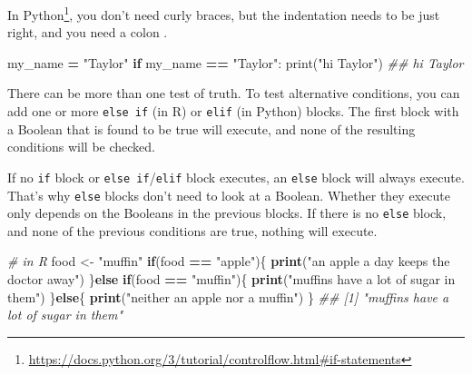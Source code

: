 \documentclass[12pt,krantz2]{krantz}
\makeatletter
\newenvironment{Shaded}{\begin{snugshade}}{\end{snugshade}}
\newcommand{\BuiltInTok}[1]{#1}
\newcommand{\CommentTok}[1]{\textcolor[rgb]{0.37,0.37,0.37}{\textit{#1}}}
\newcommand{\ControlFlowTok}[1]{\textcolor[rgb]{0.27,0.27,0.27}{\textbf{#1}}}
\newcommand{\KeywordTok}[1]{\textcolor[rgb]{0.27,0.27,0.27}{\textbf{#1}}}
\newcommand{\NormalTok}[1]{#1}
\newcommand{\OperatorTok}[1]{\textcolor[rgb]{0.43,0.43,0.43}{\textbf{#1}}}
\newcommand{\StringTok}[1]{\textcolor[rgb]{0.5,0.5,0.5}{#1}}
\renewcommand{\href}[2]{#2\footnote{\url{#1}}}
\newenvironment{kframe}{%
\medskip{}
\setlength{\fboxsep}{.8em}
 \def\at@end@of@kframe{}%
 \ifinner\ifhmode%
  \def\at@end@of@kframe{\end{minipage}}%
  \begin{minipage}{\columnwidth}%
 \fi\fi%
 \def\FrameCommand##1{\hskip\@totalleftmargin \hskip-\fboxsep
 \colorbox{shadecolor}{##1}\hskip-\fboxsep
     \hskip-\linewidth \hskip-\@totalleftmargin \hskip\columnwidth}%
 \MakeFramed {\advance\hsize-\width
   \@totalleftmargin\z@ \linewidth\hsize
   \@setminipage}}%
 {\par\unskip\endMakeFramed%
 \at@end@of@kframe}
\renewenvironment{Shaded}{\begin{kframe}}{\end{kframe}}
\makeatother
\begin{document}
\href{https://docs.python.org/3/tutorial/controlflow.html\#if-statements}{In Python}, you don't need curly braces, but the indentation needs to be just right, and you need a colon \citep{Lutz13}.

\begin{Shaded}
\begin{Highlighting}[]
\NormalTok{my_name }\OperatorTok{=} \StringTok{"Taylor"}
\ControlFlowTok{if}\NormalTok{ my_name }\OperatorTok{==} \StringTok{"Taylor"}\NormalTok{:}
    \BuiltInTok{print}\NormalTok{(}\StringTok{"hi Taylor"}\NormalTok{)}
\CommentTok{## hi Taylor}
\end{Highlighting}
\end{Shaded}

There can be more than one test of truth. To test alternative conditions, you can add one or more \texttt{else\ if} (in R) or \texttt{elif} (in Python) blocks. The first block with a Boolean that is found to be true will execute, and none of the resulting conditions will be checked.

If no \texttt{if} block or \texttt{else\ if}/\texttt{elif} block executes, an \texttt{else} block will always execute. That's why \texttt{else} blocks don't need to look at a Boolean. Whether they execute only depends on the Booleans in the previous blocks. If there is no \texttt{else} block, and none of the previous conditions are true, nothing will execute.

\begin{Shaded}
\begin{Highlighting}[]
\CommentTok{# in R}
\NormalTok{food <-}\StringTok{ "muffin"}
\ControlFlowTok{if}\NormalTok{(food }\OperatorTok{==}\StringTok{ "apple"}\NormalTok{)\{}
    \KeywordTok{print}\NormalTok{(}\StringTok{"an apple a day keeps the doctor away"}\NormalTok{)}
\NormalTok{\}}\ControlFlowTok{else} \ControlFlowTok{if}\NormalTok{(food }\OperatorTok{==}\StringTok{ "muffin"}\NormalTok{)\{}
  \KeywordTok{print}\NormalTok{(}\StringTok{"muffins have a lot of sugar in them"}\NormalTok{)}
\NormalTok{\}}\ControlFlowTok{else}\NormalTok{\{}
  \KeywordTok{print}\NormalTok{(}\StringTok{"neither an apple nor a muffin"}\NormalTok{)}
\NormalTok{\}}
\CommentTok{## [1] "muffins have a lot of sugar in them"}
\end{Highlighting}
\end{Shaded}
\end{document}
